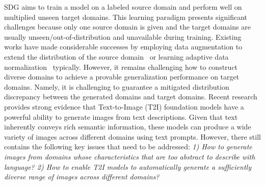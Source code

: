 SDG aims to train a model on a labeled source domain and perform well on multiplied unseen target domains.  
This learning paradigm presents significant challenges because only one source domain is given and the target domains are usually unseen/out-of-distribution and unavailable during training.
Existing works have made considerable successes by employing data augmentation to extend the distribution of the source domain~\cite{carlucci2019domain, shankar2018generalizing} or learning adaptive data normalization~\cite{fan2021adversarially} typically.
However, it remains challenging how to construct diverse domains to achieve a provable generalization performance on target domains. 
Namely, it is challenging to guarantee a mitigated distribution discrepancy between the generated domains and target domains.
Recent research provides strong evidence that Text-to-Image (T2I) foundation models have a powerful ability to generate images from text descriptions. Given that text inherently conveys rich semantic information, these models can produce a wide variety of images across different domains using text prompts. 
However, there still contains the following key issues that need to be addressed:
\emph{1) How to generate images from domains whose characteristics that are too abstract to describe with language? 2) How to enable T2I models to automatically generate a sufficiently diverse range of images across different domains?}


